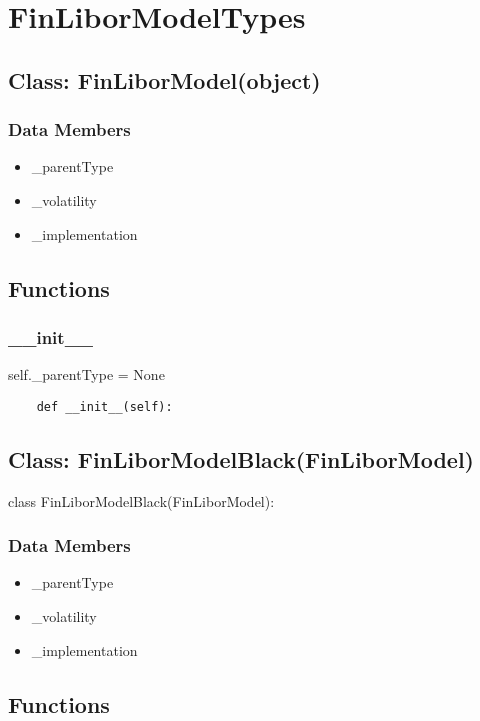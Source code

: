 \documentclass[twoside,11pt]{book}
\begin{document}
\section{FinLiborModelTypes}

\subsection*{Class: FinLiborModel(object)}


\subsubsection*{Data Members}
\begin{itemize}
\item{\_parentType}
\item{\_volatility}
\item{\_implementation}
\end{itemize}

\subsection*{Functions}

\subsubsection*{{\bf \_\_init\_\_}}
self.\_parentType = None 

\begin{lstlisting}
    def __init__(self):
\end{lstlisting}

\subsection*{Class: FinLiborModelBlack(FinLiborModel)}
class FinLiborModelBlack(FinLiborModel): 

\subsubsection*{Data Members}
\begin{itemize}
\item{\_parentType}
\item{\_volatility}
\item{\_implementation}
\end{itemize}

\subsection*{Functions}
\end{document}
